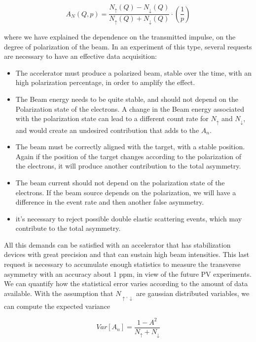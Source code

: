 \begin{equation}
A_{N} (Q,p) = \dfrac{N_{\uparrow}(Q) - N_{\downarrow}(Q)}{N_{\uparrow}(Q) + N_{\downarrow}(Q)} \cdot (\frac{1}{p})   
\end{equation} 

where we have explained the dependence on the transmitted impulse, on the degree of polarization of the beam.
In an experiment of this type, several requests are necessary to have an effective data acquisition:

\begin{itemize}
\item The accelerator must produce a polarized beam, stable over the time, with an high polarization percentage, in order to amplify the effect.
\item The Beam energy needs to be quite stable, and should not depend on the Polarization state of the electrons. A change in the Beam energy associated with the polarization state can lead to a different count rate for $N_{\uparrow}$ and $N_{\downarrow}$, and would create an undesired contribution that adds to the $A_{n}$.
\item The beam must be correctly aligned with the target, with a stable position. Again if the position of the target changes according to the polarization of the electrons, it will produce another contribution to the total asymmetry.
\item The beam current should not depend on the polarization state of the electrons. If the beam source depends on the polarization, we will have a difference in the event rate and then another false asymmetry.
\item it's necessary to reject possible double elastic scattering events, which may contribute to the total asymmetry. 
\end{itemize}

All this demands can be satisfied with an accelerator that has stabilization devices with great precision and that can sustain high beam intensities. This last request is necessary to accumulate enough statistics to measure the transverse asymmetry with an accuracy about 1 ppm, in view of the future PV experiments. We can quantify how the statistical error varies according to the amount of data available. With the assumption that $N_{\uparrow,\downarrow}$ are gaussian distributed variables, we can compute the expected variance

\begin{equation}
Var[A_{n}] = \dfrac{1 - A^{2}}{N_{\uparrow} + N_{\downarrow}} 
\end{equation}

